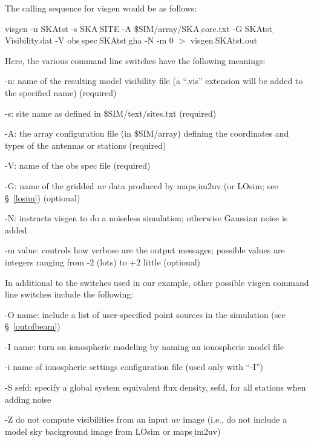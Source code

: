 \documentclass[12pt,psfig]{article}
\begin{document}
The calling sequence for {\sf visgen} would be as follows:

\bigskip

\noindent {\tiny \%}visgen -n SKAtst -s SKA$\underline~$SITE -A 
\$SIM/array/SKA$\underline~$core.txt 
-G SKAtst$\underline~$Visibility.dat -V 
obs$\underline~$spec$\underline~$SKAtst$\underline~$gha 
-N -m 0 $>$ visgen$\underline~$SKAtst.out

\bigskip

\noindent Here, the various command line switches have the following
meanings:

\begin{flushleft}
-n: name of the resulting model visibility file (a ``.vis'' extension
 will be added to the specified name) (required)

-s: site name as defined in \$SIM/text/sites.txt (required)

-A: the array configuration file (in \$SIM/array) 
defining the coordinates and types
 of the antennas or stations (required)

-V: name of the obs spec file (required)

-G:  name of the gridded $uv$ data produced by {\sf
 maps$\underline~$im2uv} (or {\sf LOsim}; see \S~\ref{losim}) (optional)

-N: instructs {\sf visgen} to do a noiseless simulation; otherwise
 Gaussian noise is added 

-m value: controls how verbose are the output messages; possible values
 are integers ranging from -2 (lots) to +2 little (optional)

\end{flushleft}

\noindent In additional to the switches used in our example, other
possible {\sf visgen} command line switches include the following:

\begin{flushleft}

-O name: include a list of user-specified point sources in the
 simulation (see \S~\ref{outofbeam}) 

-I name: turn on ionospheric modeling by naming an ionospheric model file

-i name of ionospheric settings configuration file (used only with ``-I'')

-S sefd: specify a global system equivalent flux density, sefd, for all
 stations when adding noise

-Z do not compute visibilities from an input $uv$ image (i.e., do not
 include a model sky background image from {\sf LOsim} or {\sf
 maps$\underline~$im2uv}) 

\end{flushleft}
\end{document}
